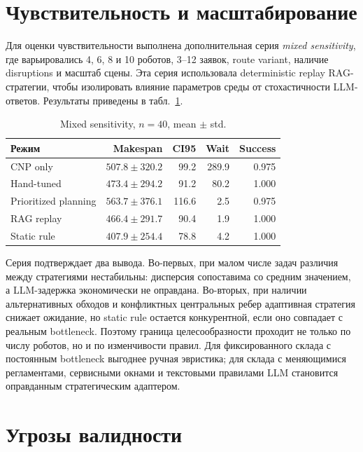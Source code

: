 \documentclass[runningheads]{llncs}
\begin{document}
\section{Чувствительность и масштабирование}

Для оценки чувствительности выполнена дополнительная серия \textit{mixed sensitivity}, где варьировались 4, 6, 8 и 10 роботов, 3--12 заявок, route variant, наличие disruptions и масштаб сцены. Эта серия использовала deterministic replay RAG-стратегии, чтобы изолировать влияние параметров среды от стохастичности LLM-ответов. Результаты приведены в табл.~\ref{tab:mixed}.

\begin{table}[!htbp]
\centering
\caption{Mixed sensitivity, $n=40$, mean $\pm$ std.}
\label{tab:mixed}
\scriptsize
\begin{tabular}{lrrrr}
\toprule
Режим & Makespan & CI95 & Wait & Success \\
\midrule
CNP only & $507.8\pm320.2$ & 99.2 & 289.9 & 0.975 \\
Hand-tuned & $473.4\pm294.2$ & 91.2 & 80.2 & 1.000 \\
Prioritized planning & $563.7\pm376.1$ & 116.6 & 2.5 & 0.975 \\
RAG replay & $466.4\pm291.7$ & 90.4 & 1.9 & 1.000 \\
Static rule & $407.9\pm254.4$ & 78.8 & 4.2 & 1.000 \\
\bottomrule
\end{tabular}
\end{table}

Серия подтверждает два вывода. Во-первых, при малом числе задач различия между стратегиями нестабильны: дисперсия сопоставима со средним значением, а LLM-задержка экономически не оправдана. Во-вторых, при наличии альтернативных обходов и конфликтных центральных ребер адаптивная стратегия снижает ожидание, но static rule остается конкурентной, если оно совпадает с реальным bottleneck. Поэтому граница целесообразности проходит не только по числу роботов, но и по изменчивости правил. Для фиксированного склада с постоянным bottleneck выгоднее ручная эвристика; для склада с меняющимися регламентами, сервисными окнами и текстовыми правилами LLM становится оправданным стратегическим адаптером.

\section{Угрозы валидности}
\end{document}
